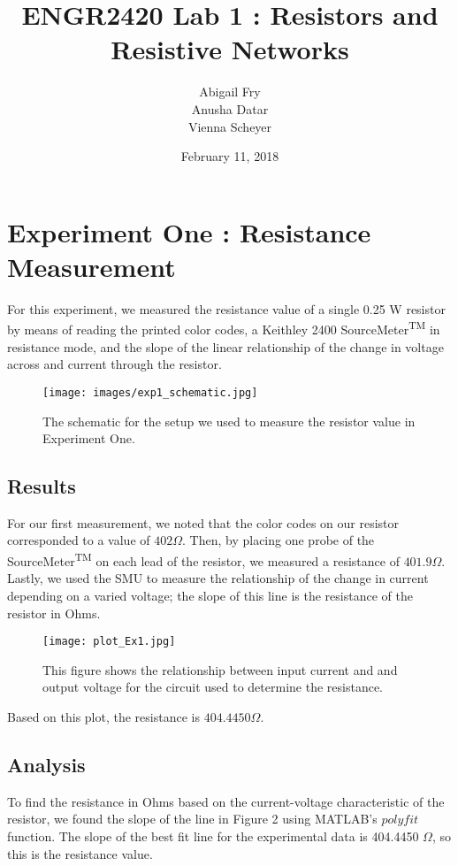 \documentclass{article}
\title{ENGR2420 Lab 1 : Resistors and Resistive Networks}
\author{Abigail Fry \\ Anusha Datar \\ Vienna Scheyer}
\date{February 11, 2018}
\begin{document}
\maketitle

\section{Experiment One : Resistance Measurement}
For this experiment, we measured the resistance value of a single 0.25 W resistor by means of reading the printed color codes, a Keithley 2400 SourceMeter\textsuperscript{TM} in resistance mode, and the slope of the linear relationship of the change in voltage across and current through the resistor.

\begin{figure}[H]   
  \centering        
  \texttt{[image: images/exp1\_schematic.jpg]}
  \caption{The schematic for the setup we used to measure the resistor value in Experiment One.}   
  \label{fig:circuits_exp1}
\end{figure}

\subsection{Results}
For our first measurement, we noted that the color codes on our resistor corresponded to a value of $402\Omega$. Then, by placing one probe of the SourceMeter\textsuperscript{TM} on each lead of the resistor, we measured a resistance of $401.9 \Omega$. Lastly, we used the SMU to measure the relationship of the change in current depending on a varied voltage; the slope of this line is the resistance of the resistor in Ohms.

\begin{figure}[H]
    \centering
    \texttt{[image: plot\_Ex1.jpg]}
    \caption{This figure shows the relationship between input current and and output voltage for the circuit used to determine the resistance.}
    \label{fig:plot_exp1}
\end{figure}

Based on this plot, the resistance is $404.4450 \Omega$.

\subsection{Analysis}

To find the resistance in Ohms based on the current-voltage characteristic of the resistor, we found the slope of the line in Figure 2 using MATLAB's $polyfit$ function. The slope of the best fit line for the experimental data is 404.4450 $\Omega$, so this is the resistance value.
\end{document}
